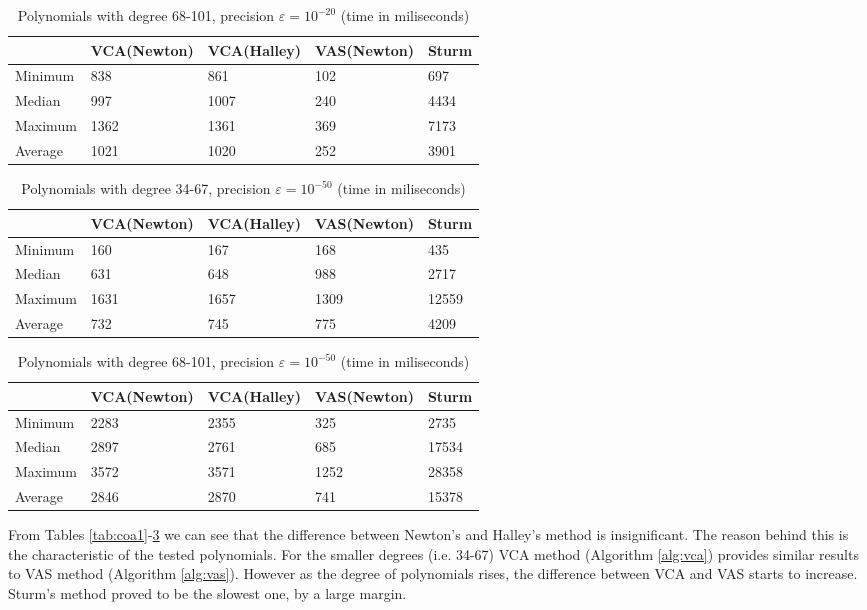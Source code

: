 \documentclass[
  digital, %
  notable,   %
  nolof,     %
  nolot,     %
	final, %
]{fithesis3}
\begin{document}
\begin{table}
  \begin{tabular*}{\textwidth}{lllll}
    \toprule
     & VCA(Newton) & VCA(Halley) & VAS(Newton) & Sturm \\
    \midrule
			Minimum & 838 & 861 & 102 & 697 \\
			Median & 997 & 1007 & 240 & 4434 \\
			Maximum & 1362 & 1361 & 369 & 7173 \\
			Average & 1021 & 1020 & 252 & 3901 \\
    \bottomrule
  \end{tabular*}
  \caption{Polynomials with degree 68-101, precision $\varepsilon = 10^{-20}$ (time in miliseconds)}
  \label{tab:coa2}
\end{table}

\begin{table}
  \begin{tabular*}{\textwidth}{lllll}
    \toprule
     & VCA(Newton) & VCA(Halley) & VAS(Newton) & Sturm \\
    \midrule
			Minimum & 160 & 167 & 168 & 435 \\
			Median & 631 & 648 & 988 & 2717 \\
			Maximum & 1631 & 1657 & 1309 & 12559 \\
			Average & 732 & 745 & 775 & 4209 \\
    \bottomrule
  \end{tabular*}
  \caption{Polynomials with degree 34-67, precision $\varepsilon = 10^{-50}$ (time in miliseconds)}
  \label{tab:coa3}
\end{table}

\begin{table}
  \begin{tabular*}{\textwidth}{lllll}
    \toprule
     & VCA(Newton) & VCA(Halley) & VAS(Newton) & Sturm \\
    \midrule
			Minimum & 2283 & 2355 & 325 & 2735 \\
			Median & 2897 & 2761 & 685 & 17534 \\
			Maximum & 3572 & 3571 & 1252 & 28358 \\
			Average & 2846 & 2870 & 741 & 15378 \\
    \bottomrule
  \end{tabular*}
  \caption{Polynomials with degree 68-101, precision $\varepsilon = 10^{-50}$ (time in miliseconds)}
  \label{tab:coa4}
\end{table}
\FloatBarrier
From Tables \ref{tab:coa1}-\ref{tab:coa4} we can see that the difference between Newton's and Halley's method is insignificant. The reason behind this is the characteristic of the tested polynomials. For the smaller degrees (i.e. 34-67) VCA method (Algorithm \ref{alg:vca}) provides similar results to VAS method (Algorithm \ref{alg:vas}). However as the degree of polynomials rises, the difference between VCA and VAS starts to increase. Sturm's method proved to be the slowest one, by a large margin.
\end{document}
